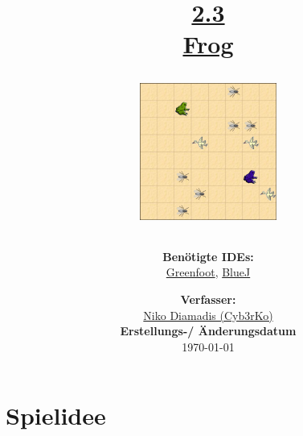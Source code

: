 \documentclass{scrartcl}   %
\begin{document}
\title{\huge{\href{https://www.inf-schule.de/oop/java/implementierung/frog}{2.3\\Frog}}\\
\vspace{0.5cm}
\begin{figure}[ht]
	\centering
	\includegraphics[height=4.5cm]{Frog.png}
\end{figure}
\vspace{0.7cm}}

\author{\textbf{Benötigte IDEs:}\\
\href{https://www.greenfoot.org/}{Greenfoot}, \href{https://www.bluej.org/}{BlueJ}
\vspace{1cm}}

\date{\textbf{Verfasser:}\\
\href{https://cyb3rko.de}{Niko Diamadis (Cyb3rKo)}\\
\vspace{1cm}
\textbf{Erstellungs-/ Änderungsdatum}\\
\today\enlargethispage{4cm}}

\doublespacing

\maketitle\thispagestyle{empty}

\cleardoublepage

\setcounter{page}{1}
\tableofcontents


\newpage
{}  %

\cleardoublepage

\section{Spielidee}
\end{document}
